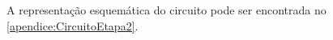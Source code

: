 		A representação esquemática do circuito pode ser encontrada no \autoref{apendice:CircuitoEtapa2}.








